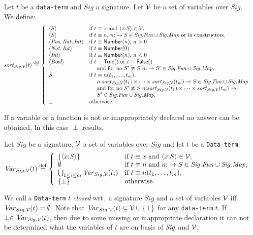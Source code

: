 \documentclass[fleqn,a4paper,dvips]{article}
\newcommand{\aterm}[1]{\mathsf{#1}}
\newcommand{\Sig}{\nm{Sig}}
\newcommand{\Fun}{\nm{Fun}}
\newcommand{\wor}{\stackrel{\mathrm{def}}{=}}
\newcommand{\NV}{{\cal V}}
\begin{document}
\begin{defn}
Let $t$ be a {\tt data-term} and $Sig$ a signature. Let $\NV$ be a set
of variables over $Sig$. We define:
\[sort_{Sig,\NV}(t)\wor\left\{
\begin{array}{ll}
\seq{S}&\mbox{if~}t\equiv x\mbox{ and }\langle x\ap S\rangle \in \NV,\\
\seq{S}&\mbox{if $t\equiv n$, $n\ap \rightarrow S\in
\Sig.\Fun\cup\Sig.\Map$ or in constructors.}\\
\seq{\nm{Pos},\nm{Nat},\nm{Int}}&\mbox{if $t\equiv\aterm{Number}(n)$, $n>0$}\\
\seq{\nm{Nat},\nm{Int}}&\mbox{if $t\equiv\aterm{Number}(0)$}\\
\seq{\nm{Int}}&\mbox{if $t\equiv\aterm{Number}(n)$, $n<0$}\\
\seq{\nm{Bool}}&\mbox{if $t\equiv\aterm{True}()$ or $t\equiv\aterm{False}()$}\\
&\hspace*{0.5cm}\mbox{and for no $S'\not\equiv S$}~n\ap \rightarrow
S'\in\Sig.\Fun\cup\Sig.\Map,\\
S&\mbox{if $t\equiv n(t_1,\ldots,t_m)$,}\\
&\mbox{$\hspace{0.5cm}n\ap sort_{Sig,\NV}(t_1)\times \cdots
\times sort_{Sig,\NV}(t_m)\rightarrow S \in \Sig.\Fun\cup\Sig.\Map$}\\
&\hspace{0.5cm}\mbox{and for
no}~S'\not\equiv S~n\ap sort_{Sig,\NV}(t_1)\times \cdots
\times sort_{Sig,\NV}(t_m)\rightarrow\\
&\hspace*{0.5cm}S' \in \Sig.\Fun\cup\Sig.\Map,\\
\perp&\mbox{otherwise}.
\end{array}\right.\]
\end{defn}
If a variable or a function is not or inappropriately declared 
no answer can be obtained. In this case $\perp$ results.
\begin{defn}
Let $Sig$ be a signature, $\NV$ a set of
variables over $Sig$ and let $t$ be a {\tt Data-term}.
\[\Var_{Sig,\NV}(t)\wor
\left\{
\begin{array}{ll}
\{\langle x\ap S\rangle\}&\mbox{if }t\equiv x\mbox{ and }\langle
x\ap S\rangle\in \NV,\\
\emptyset&\mbox{if~}t\equiv n\mbox{ and }n\ap \rightarrow S\in
\Sig.\Fun\cup\Sig.\Map,\\
\bigcup_{1\leq i\leq m} \Var_{Sig,\NV}(t_i)&\mbox{if~}t\equiv 
n(t_1,\ldots,t_m),\\
\{\perp\}&\mbox{otherwise}.
\end{array}\right.\]
\end{defn}
We call a {\tt Data-term} $t$ {\em closed} wrt.\ a signature
$Sig$ and a set of variables $\NV$ iff $\Var_{Sig,\NV}(t)=
\emptyset$. Note that $\Var_{Sig,\NV}(t)\subseteq\NV\cup\{\perp\}$
for any {\tt data-term} $t$. If $\perp\in \Var_{\Sig,\NV}(t)$, then
due  to some missing or inappropriate declaration 
it can not be determined what the variables of $t$ are on basis of
$\Sig$ and $\NV$.
\end{document}
